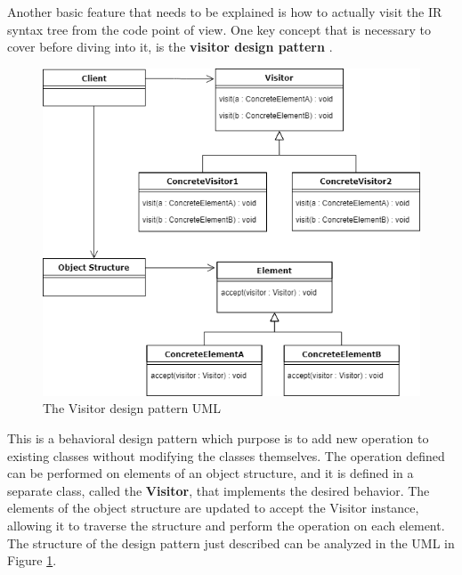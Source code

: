 Another basic feature that needs to be explained is how to actually visit the IR syntax tree from the code point of view. One key concept that is necessary to cover before diving into it, is the \textbf{visitor design pattern} \cite{visitor_design_pattern}.
\begin{figure}[!ht]
    \centering
    \includegraphics[scale=0.6]{document/chapters/2-metaprogramming/images/visitor_pattern_uml.png}
    \caption{The Visitor design pattern UML \cite{visitor_design_pattern}}
    \label{fig:visitor_uml}
\end{figure}
This is a behavioral design pattern which purpose is to add new operation to existing classes without modifying the classes themselves. 
The operation defined can be performed on elements of an object structure, and it is defined in a separate class, called the \textbf{Visitor}, that implements the desired behavior. The elements of the object structure are updated to accept the Visitor instance, allowing it to traverse the structure and perform the operation on each element. The structure of the design pattern just described can be analyzed in the UML in Figure \ref{fig:visitor_uml}.

